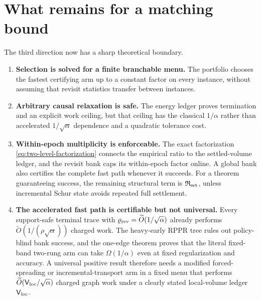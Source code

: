 \section{What remains for a matching bound}
\label{sec:remaining}

The third direction now has a sharp theoretical boundary.

\begin{enumerate}[leftmargin=*]
 \item \textbf{Selection is solved for a finite branchable menu.}
 The portfolio chooses the fastest certifying arm up to a constant factor on
 every instance, without assuming that revisit statistics transfer between
 instances.

 \item \textbf{Arbitrary causal relaxation is safe.}
 The energy ledger proves termination and an explicit work ceiling, but that
 ceiling has the classical $1/\alpha$ rather than accelerated
 $1/\sqrt\alpha$ dependence and a quadratic tolerance cost.

 \item \textbf{Within-epoch multiplicity is enforceable.}
 The exact factorization \eqref{eq:two-level-factorization} connects the
 empirical ratio to the settled-volume ledger, and the revisit bank caps its
 within-epoch factor online.  A global bank also certifies the complete fast
 path whenever it succeeds.  For a theorem guaranteeing success, the
 remaining structural term is $\mathfrak R_{\rm set}$, unless incremental
 Schur state avoids repeated full settlement.

 \item \textbf{The accelerated fast path is certifiable but not universal.}
 Every support-safe terminal trace with
 $\varrho_{\rm rev}=\widetilde O(1/\sqrt\alpha)$ already performs
 $\widetilde O(1/(\rho\sqrt\alpha))$ charged work.  The heavy-early RPPR
 tree rules out policy-blind bank success, and the one-edge theorem proves
 that the literal fixed-band two-rung arm can take $\Omega(1/\alpha)$ even at
 fixed regularization and accuracy.  A universal positive result therefore
 needs a modified forced-spreading or incremental-transport arm in a fixed
 menu that performs
 $\widetilde O(\mathsf V_{\rm loc}/\sqrt\alpha)$ charged graph work under a clearly stated
 local-volume ledger $\mathsf V_{\rm loc}$.


\end{enumerate}
